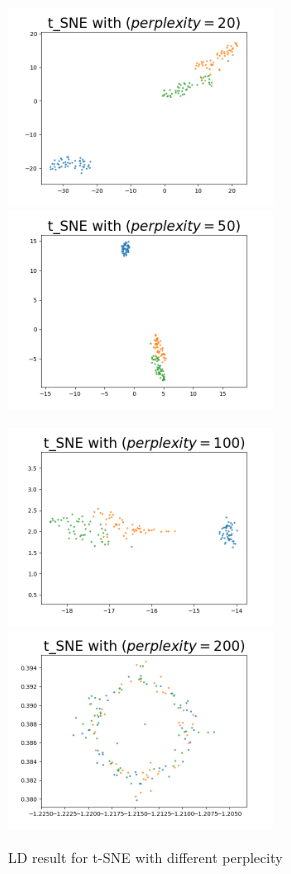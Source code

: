 \begin{figure}[H]
\centering  %
{
\label{Fig.sub.1}
\includegraphics[width=7cm,height=4cm\textwidth]{images/image_comparison_tsne_perp20.png}}
{
\label{Fig.sub.2}
\includegraphics[width=7cm,height=4cm\textwidth]{images/image_comparison_tsne_perp50.png}}

\centering  %
{
\label{Fig.sub.1}
\includegraphics[width=7cm,height=4cm\textwidth]{images/image_comparison_tsne_perp100.png}}
{
\label{Fig.sub.2}
\includegraphics[width=7cm,height=4cm\textwidth]{images/image_comparison_tsne_perp200.png}}
\caption{LD result for t-SNE with different perplecity}
\end{figure}


